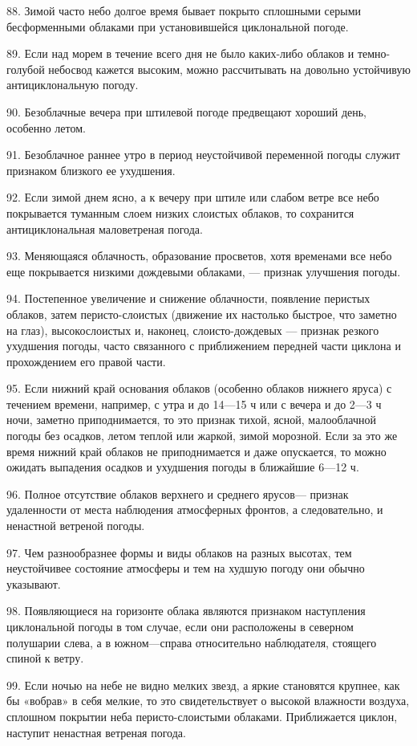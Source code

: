 88. Зимой часто небо долгое время бывает покрыто сплошными серыми бесформенными облаками при установившейся циклональной погоде.

89. Если над морем в течение всего дня не было каких-либо облаков и темно-голубой небосвод кажется высоким, можно рассчитывать на довольно устойчивую антициклональную погоду.

90. Безоблачные вечера при штилевой погоде предвещают хороший день, особенно летом.

91. Безоблачное раннее утро в период неустойчивой переменной погоды служит признаком близкого ее ухудшения.

92. Если зимой днем ясно, а к вечеру при штиле или слабом ветре все небо покрывается туманным слоем низких слоистых облаков, то сохранится антициклональная маловетреная погода.

93. Меняющаяся облачность, образование просветов, хотя временами все небо еще покрывается низкими дождевыми облаками, — признак улучшения погоды.

94. Постепенное увеличение и снижение облачности, появление перистых облаков, затем перисто-слоистых (движение их настолько быстрое, что заметно на глаз), высокослоистых и, наконец, слоисто-дождевых — признак резкого ухудшения погоды, часто связанного с приближением передней части циклона и прохождением его правой части.

95. Если нижний край основания облаков (особенно облаков нижнего яруса) с течением времени, например, с утра и до 14—15 ч или с вечера и до 2—3 ч ночи, заметно приподнимается, то это признак тихой, ясной, малооблачной погоды без осадков, летом теплой или жаркой, зимой морозной. Если за это же время нижний край облаков не приподнимается и даже опускается, то можно ожидать выпадения осадков и ухудшения погоды в ближайшие 6—12 ч.

96. Полное отсутствие облаков верхнего и среднего ярусов— признак удаленности от места наблюдения атмосферных фронтов, а следовательно, и ненастной ветреной погоды.

97. Чем разнообразнее формы и виды облаков на разных высотах, тем неустойчивее состояние атмосферы и тем на худшую погоду они обычно указывают.

98. Появляющиеся на горизонте облака являются признаком наступления циклональной погоды в том случае, если они расположены в северном полушарии слева, а в южном—справа относительно наблюдателя, стоящего спиной к ветру.

99. Если ночью на небе не видно мелких звезд, а яркие становятся крупнее, как бы «вобрав» в себя мелкие, то это свидетельствует о высокой влажности воздуха, сплошном покрытии неба перисто-слоистыми облаками. Приближается циклон, наступит ненастная ветреная погода.

